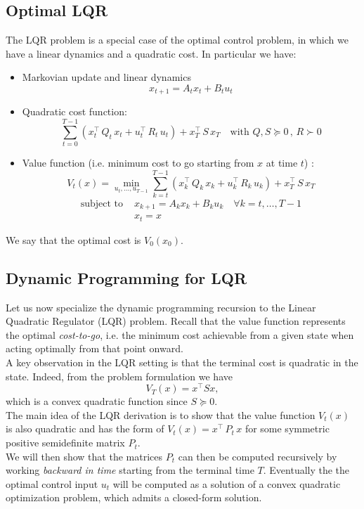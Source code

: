 \subsection{Optimal LQR}
The LQR problem is a special case of the optimal control problem, in which we have a linear dynamics and a quadratic cost. In particular we have:
\begin{itemize}
    \item Markovian update and linear dynamics
    $$ x_{t+1} = A_t x_t + B_t u_t$$
    \item Quadratic cost function:
    $$ \sum_{t=0}^{T-1} \left( x_t^\top\, Q_t\, x_t + u_t^\top\, R_t\, u_t \right) + x_T^\top \,S \,x_T \quad \text{with }Q,S\succeq 0 \, , \, R \succ 0 $$
    \item Value function (i.e. minimum cost to go starting from $x$ at time $t$) :
    $$V_t (x) = \min_{u_t,\dots,u_{T-1}} \sum_{k=t}^{T-1} \left( x_k^\top\, Q_k\, x_k + u_k^\top\, R_k\, u_k \right) + x_T^\top \,S \,x_T$$
    \begin{align*}
        \text{subject to } &x_{k+1} = A_k x_k + B_k u_k \quad \forall k=t,\dots,T-1 \\
        &x_t = x
    \end{align*}
\end{itemize}
We say that the optimal cost is $V_0(x_0)$.

\subsection{Dynamic Programming for LQR}

Let us now specialize the dynamic programming recursion to the Linear Quadratic Regulator (LQR) problem.  
Recall that the value function represents the optimal \emph{cost-to-go}, i.e. the minimum cost achievable from a given state when acting optimally from that point onward.\\
A key observation in the LQR setting is that the terminal cost is quadratic in the state.  
Indeed, from the problem formulation we have
\[
V_T(x) = x^\top S x ,
\]
which is a convex quadratic function since $S \succeq 0$.\\
The main idea of the LQR derivation is to show that the value function $V_t(x)$ is also quadratic and has the form of $V_t(x) = x^\top\, P_t \,x$ for some symmetric positive semidefinite matrix $P_t$.\\
We will then show that the matrices $P_t$ can then be computed recursively by working \emph{backward in time} starting from the terminal time $T$.
Eventually the the optimal control input $u_t$ will be computed as a solution of a convex quadratic optimization problem, which admits a closed-form solution.\\

